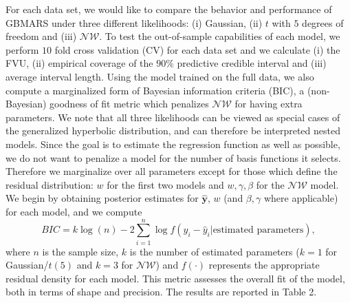 \documentclass{article} %
\newcommand{\NIG}{\mathcal{NW}}
\begin{document}
For each data set, we would like to compare the behavior and performance of GBMARS under three different likelihoods: (i) Gaussian, (ii) $t$ with $5$ degrees of freedom and (iii) $\NIG$. To test the out-of-sample capabilities of each model, we perform $10$ fold cross validation (CV) for each data set and we calculate (i) the FVU, (ii) empirical coverage of the $90\%$ predictive credible interval and (iii) average interval length. Using the model trained on the full data, we also compute a marginalized form of Bayesian information criteria (BIC), a (non-Bayesian) goodness of fit metric which penalizes $\NIG$ for having extra parameters. We note that all three likelihoods can be viewed as special cases of the generalized hyperbolic distribution, and can therefore be interpreted nested models. Since the goal is to estimate the regression function as well as possible, we do not want to penalize a model for the number of basis functions it selects. Therefore we marginalize over all parameters except for those which define the residual distribution: $w$ for the first two models and $w,\gamma,\beta$ for the $\NIG$ model. We begin by obtaining posterior estimates for $\bm{\hat y}$, $w$ (and $\beta,\gamma$ where applicable) for each model, and we compute
\begin{equation}
BIC = k\log(n) - 2\sum_{i=1}^n\log f(y_i - \hat y_i| \text{estimated parameters}),
\end{equation}
where $n$ is the sample size, $k$ is the number of estimated parameters ($k=1$ for Gaussian/$t(5)$ and $k=3$ for $\NIG$) and $f(\cdot)$ represents the appropriate residual density for each model. This metric assesses the overall fit of the model, both in terms of shape and precision. The results are reported in Table 2. 
\end{document}
